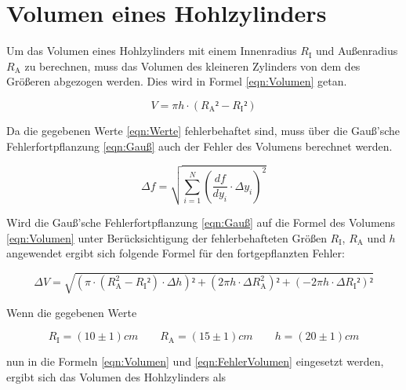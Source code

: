 \documentclass[titlepage = firstcover]{scrartcl}
\begin{document}
    \newpage
    \section{Volumen eines Hohlzylinders}
            Um das Volumen eines Hohlzylinders mit einem Innenradius $R_{\text{I}}$ und Außenradius $R_{\text{A}}$ zu berechnen, muss das Volumen des kleineren Zylinders von dem des Größeren
            abgezogen werden. Dies wird in Formel \ref{eqn:Volumen} getan.
            
            \begin{equation}
                V = \pi h \cdot (R_{\text{A}}²-R_{\text{I}}²)
                \label{eqn:Volumen}
            \end{equation}

            \noindent Da die gegebenen Werte \ref{eqn:Werte} fehlerbehaftet sind, muss über die Gauß'sche Fehlerfortpflanzung \ref{eqn:Gauß} auch der Fehler des 
            Volumens berechnet werden.

            \begin{equation}
                \Delta f = \sqrt{\sum_{i=1}^N \left(\frac{df}{dy_i} \cdot \Delta y_i\right)^2}
                \label{eqn:Gauß}
            \end{equation}

            \noindent Wird die Gauß'sche Fehlerfortpflanzung \ref{eqn:Gauß} auf die Formel des Volumens \ref{eqn:Volumen} unter Berücksichtigung der fehlerbehafteten 
            Größen $R_{\text{I}}$, $R_{\text{A}}$ und $h$ angewendet ergibt sich folgende Formel für den fortgepflanzten Fehler:

            \begin{equation}
                \Delta V = \sqrt{(\pi \cdot (R_{\text{A}}^2-R_{\text{I}}²)\cdot \Delta h)² + (2 \pi h \cdot \Delta R_{\text{A}}^2)² + (-2\pi h \cdot \Delta R_{\text{I}}²)²}
                \label{eqn:FehlerVolumen}
            \end{equation}

            \noindent Wenn die gegebenen Werte

            \begin{equation}
                R_{\text{I}}=(10\pm1)cm \qquad  R_{\text{A}}=(15\pm1)cm \qquad h = (20\pm1)cm
                \label{eqn:Werte}
            \end{equation}

            \noindent nun in die Formeln \ref{eqn:Volumen} und \ref{eqn:FehlerVolumen} eingesetzt werden, ergibt sich das Volumen des Hohlzylinders als
\end{document}
